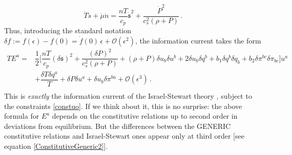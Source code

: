 \documentclass[a4paper, amsfonts, amssymb, amsmath, reprint, showkeys, nofootinbib, twoside, onecolumn, notitlepage]{revtex4-1}
\theoremstyle{definition}
\theoremstyle{theorem}
\begin{document}
\begin{equation}
\dot{T}\dot{s}+\dot{\mu}\dot{n}= \dfrac{nT}{c_p} \dot{\mathfrak{s}}^2 + \dfrac{\dot{P}^2}{c_s^2(\rho+P)} \, .
\end{equation}
Thus, introducing the standard notation $\delta f:=f(\epsilon)-f(0)= \dot{f}(0) \, \epsilon +\mathcal{O}(\epsilon^2)$, the information current takes the form
\begin{equation}
\begin{split}
TE^a ={ } & \dfrac{1}{2} \bigg[  \dfrac{nT}{c_p} (\delta\mathfrak{s})^2 + \dfrac{(\delta P)^2}{c_s^2(\rho+P)}   +  (\rho+P) \delta u_b \delta u^b+2\delta u_b \delta q^b + b_1  \delta q^b \delta q_b    +b_2  \delta \pi^{bc}\delta \pi_{bc} \bigg]u^a \\
& +\dfrac{\delta T \delta q^a}{T} + \delta P\delta u ^a + \delta u_b \delta \pi^{ba} +\mathcal{O}(\epsilon^3)   \, . \\
\end{split}
\end{equation} 
This is \textit{exactly} the information current of the Israel-Stewart theory \cite{Hishcock1983,GavassinoGibbs2021,Almaalol2022,GavassinoUniversality2023}, subject to the constraints \eqref{constuo}. If we think about it, this is no surprise: the above formula for $E^a$ depends on the constitutive relations up to second order in deviations from equilibrium. But the differences between the GENERIC constitutive relations and Israel-Stewart ones appear only at third order [see equation \eqref{ConstitutiveGeneric2}].
\end{document}
